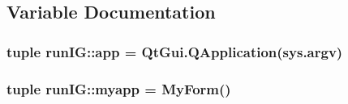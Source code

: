 \subsection{Variable Documentation}
\hypertarget{namespacerunIG_a073eb8feb47ebdcaf6058330048c0ad0}{
\subsubsection[{app}]{\setlength{\rightskip}{0pt plus 5cm}tuple {\bf runIG::app} = QtGui.QApplication(sys.argv)}}
\label{namespacerunIG_a073eb8feb47ebdcaf6058330048c0ad0}
\hypertarget{namespacerunIG_a9312207d47c3cb5599c47c569750221e}{
\subsubsection[{myapp}]{\setlength{\rightskip}{0pt plus 5cm}tuple {\bf runIG::myapp} = {\bf MyForm}()}}
\label{namespacerunIG_a9312207d47c3cb5599c47c569750221e}
